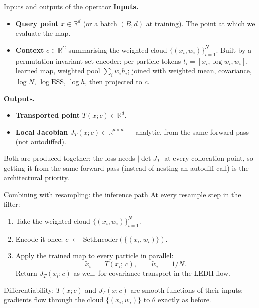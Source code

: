 \documentclass[10pt,aspectratio=169]{beamer}
\newcommand{\R}{\mathbb{R}}
\begin{document}
\begin{frame}{Inputs and outputs of the operator}
  \textbf{Inputs.}
  \begin{itemize}\setlength{\itemsep}{0.2em}
    \item \textbf{Query point} $x \in \R^d$ (or a batch $(B, d)$ at training). The point at which we evaluate the map.
    \item \textbf{Context} $c \in \R^C$ summarising the weighted cloud $\{(x_i, w_i)\}_{i=1}^N$. Built by a permutation-invariant set encoder: per-particle tokens $t_i = [x_i, \log w_i, w_i]$, learned map, weighted pool $\sum_i w_i h_i$; joined with weighted mean, covariance, $\log N$, $\log \mathrm{ESS}$, $\log h$, then projected to $c$.
  \end{itemize}

  \medskip
  \textbf{Outputs.}
  \begin{itemize}\setlength{\itemsep}{0.2em}
    \item \textbf{Transported point} $T(x; c) \in \R^d$.
    \item \textbf{Local Jacobian} $J_T(x; c) \in \R^{d \times d}$ --- analytic, from the same forward pass (not autodiffed).
  \end{itemize}

  \medskip
  Both are produced together; the loss needs $|\det J_T|$ at every collocation point, so getting it from the same forward pass (instead of nesting an autodiff call) is the architectural priority.
\end{frame}

\begin{frame}{Combining with resampling: the inference path}
  At every resample step in the filter:
  \begin{enumerate}\setlength{\itemsep}{0.3em}
    \item Take the weighted cloud $\{(x_i, w_i)\}_{i=1}^N$.
    \item Encode it once: $c \;\leftarrow\; \mathrm{SetEncoder}(\{(x_i, w_i)\})$.
    \item Apply the trained map to every particle in parallel:
    \[
      \tilde x_i \;=\; T(x_i;\, c), \qquad \tilde w_i \;=\; 1/N.
    \]
    Return $J_T(x_i; c)$ as well, for covariance transport in the LEDH flow.
  \end{enumerate}

  \medskip
  Differentiability: $T(x; c)$ and $J_T(x; c)$ are smooth functions of their inputs; gradients flow through the cloud $\{(x_i, w_i)\}$ to $\theta$ exactly as before.
\end{frame}
\end{document}
